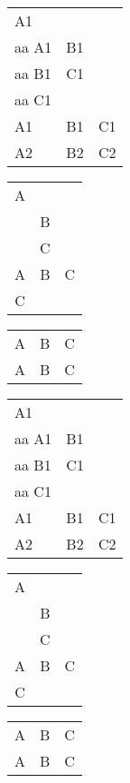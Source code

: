 \documentclass[russian]{report}
\begin{document}
\begin{tabular}{|>{\centering}p{0.08\paperwidth}|>{\centering}b{0.08\paperwidth}|>{\centering}m{0.08\paperwidth}|}
\hline
A1 \\ aa A1 & B1 \\ aa B1 & C1 \\ aa C1 \tabularnewline
\hline
A1 & B1 & C1 \tabularnewline
\hline
A2 & B2 & C2 \tabularnewline
\hline
\end{tabular}

\begin{tabular}{|c|c|c|}
A \tabularnewline & B \tabularnewline & C \tabularnewline
A & B & C \tabularnewline C
\end{tabular}
\begin{tabular}{|c|c|c|}
A & B & C \tabularnewline
A & B & C \tabularnewline
\end{tabular}

\begin{longtable}{|>{\centering}p{0.08\paperwidth}|>{\centering}b{0.08\paperwidth}|>{\centering}m{0.08\paperwidth}|}
\hline
A1 \\ aa A1 & B1 \\ aa B1 & C1 \\ aa C1 \tabularnewline
\hline
A1 & B1 & C1 \tabularnewline
\hline
A2 & B2 & C2 \tabularnewline
\hline
\end{longtable}

\begin{longtable}{|c|c|c|}
A \tabularnewline & B \tabularnewline & C \tabularnewline
A & B & C \tabularnewline C
\end{longtable}
\begin{longtable}{|c|c|c|}
A & B & C \tabularnewline
A & B & C \tabularnewline
\end{longtable}
\end{document}
